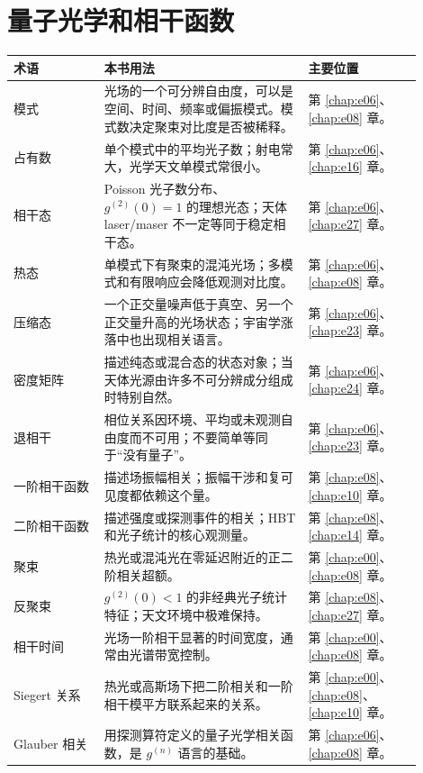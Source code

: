 \section{量子光学和相干函数}
\label{appsec:c-optics}

\begin{longtable}{p{0.20\linewidth}p{0.45\linewidth}p{0.25\linewidth}}
\toprule
术语 & 本书用法 & 主要位置 \\
\midrule
模式 & 光场的一个可分辨自由度，可以是空间、时间、频率或偏振模式。模式数决定聚束对比度是否被稀释。 & 第 \ref{chap:e06}、\ref{chap:e08} 章。 \\
占有数 & 单个模式中的平均光子数；射电常大，光学天文单模式常很小。 & 第 \ref{chap:e06}、\ref{chap:e16} 章。 \\
相干态 & Poisson 光子数分布、\(g^{(2)}(0)=1\) 的理想光态；天体 laser/maser 不一定等同于稳定相干态。 & 第 \ref{chap:e06}、\ref{chap:e27} 章。 \\
热态 & 单模式下有聚束的混沌光场；多模式和有限响应会降低观测对比度。 & 第 \ref{chap:e06}、\ref{chap:e08} 章。 \\
压缩态 & 一个正交量噪声低于真空、另一个正交量升高的光场状态；宇宙学涨落中也出现相关语言。 & 第 \ref{chap:e06}、\ref{chap:e23} 章。 \\
密度矩阵 & 描述纯态或混合态的状态对象；当天体光源由许多不可分辨成分组成时特别自然。 & 第 \ref{chap:e06}、\ref{chap:e24} 章。 \\
退相干 & 相位关系因环境、平均或未观测自由度而不可用；不要简单等同于“没有量子”。 & 第 \ref{chap:e06}、\ref{chap:e23} 章。 \\
一阶相干函数 & 描述场振幅相关；振幅干涉和复可见度都依赖这个量。 & 第 \ref{chap:e08}、\ref{chap:e10} 章。 \\
二阶相干函数 & 描述强度或探测事件的相关；HBT 和光子统计的核心观测量。 & 第 \ref{chap:e08}、\ref{chap:e14} 章。 \\
聚束 & 热光或混沌光在零延迟附近的正二阶相关超额。 & 第 \ref{chap:e00}、\ref{chap:e08} 章。 \\
反聚束 & \(g^{(2)}(0)<1\) 的非经典光子统计特征；天文环境中极难保持。 & 第 \ref{chap:e08}、\ref{chap:e27} 章。 \\
相干时间 & 光场一阶相干显著的时间宽度，通常由光谱带宽控制。 & 第 \ref{chap:e00}、\ref{chap:e08} 章。 \\
Siegert 关系 & 热光或高斯场下把二阶相关和一阶相干模平方联系起来的关系。 & 第 \ref{chap:e00}、\ref{chap:e08}、\ref{chap:e10} 章。 \\
Glauber 相关 & 用探测算符定义的量子光学相关函数，是 \(g^{(n)}\) 语言的基础。 & 第 \ref{chap:e06}、\ref{chap:e08} 章。 \\
\bottomrule
\end{longtable}

